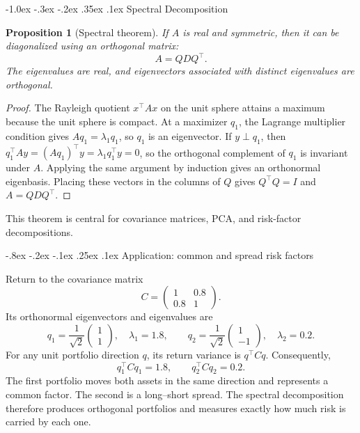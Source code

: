 \documentclass[10pt]{article}
\makeatletter
\renewcommand\subsection{\@startsection{subsection}{2}{\z@}%
  {-1.0ex \@plus -.3ex \@minus -.2ex}%
  {.35ex \@plus .1ex}%
  {\normalfont\normalsize\bfseries}}
\renewcommand\subsubsection{\@startsection{subsubsection}{3}{\z@}%
  {-.8ex \@plus -.2ex \@minus -.1ex}%
  {.25ex \@plus .1ex}%
  {\normalfont\normalsize\bfseries\itshape}}
\theoremstyle{compactdefinition}
\theoremstyle{compactproposition}
\newtheorem{proposition}{Proposition}[section]
\makeatother
\begin{document}
\subsection{Spectral Decomposition}

\begin{proposition}[Spectral theorem]
If $A$ is real and symmetric, then it can be diagonalized using an orthogonal
matrix:
\[
A=QDQ^\top.
\]
The eigenvalues are real, and eigenvectors associated with distinct eigenvalues
are orthogonal.
\end{proposition}

\begin{proof}
The Rayleigh quotient $x^\top Ax$ on the unit sphere attains a maximum because
the unit sphere is compact. At a maximizer $q_1$, the Lagrange multiplier
condition gives $Aq_1=\lambda_1 q_1$, so $q_1$ is an eigenvector. If
$y\perp q_1$, then $q_1^\top Ay=(Aq_1)^\top y=\lambda_1 q_1^\top y=0$, so the
orthogonal complement of $q_1$ is invariant under $A$. Applying the same
argument by induction gives an orthonormal eigenbasis. Placing these vectors in
the columns of $Q$ gives $Q^\top Q=I$ and $A=QDQ^\top$.
\end{proof}

This theorem is central for covariance matrices, PCA, and risk-factor
decompositions.

\subsubsection{Application: common and spread risk factors}

Return to the covariance matrix
\[
C=\begin{pmatrix}1&0.8\\0.8&1\end{pmatrix}.
\]
Its orthonormal eigenvectors and eigenvalues are
\[
q_1=\frac{1}{\sqrt2}\begin{pmatrix}1\\1\end{pmatrix},
\quad \lambda_1=1.8,
\qquad
q_2=\frac{1}{\sqrt2}\begin{pmatrix}1\\-1\end{pmatrix},
\quad \lambda_2=0.2.
\]
For any unit portfolio direction $q$, its return variance is $q^\top Cq$.
Consequently,
\[
q_1^\top Cq_1=1.8,
\qquad
q_2^\top Cq_2=0.2.
\]
The first portfolio moves both assets in the same direction and represents a
common factor. The second is a long--short spread. The spectral decomposition
therefore produces orthogonal portfolios and measures exactly how much risk is
carried by each one.
\end{document}
